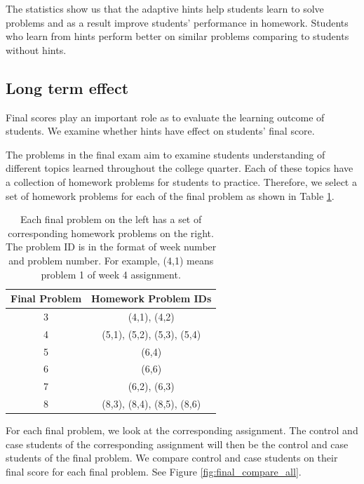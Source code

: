 \documentclass{llncs}
\begin{document}
The statistics show us that the adaptive hints help students learn to solve problems and as a result improve students' performance in homework. Students who learn from hints perform better on similar problems comparing to students without hints.

\subsection{Long term effect}
Final scores play an important role as to evaluate the learning outcome of students. We examine whether hints have effect on students' final score.

The problems in the final exam aim to examine students understanding of different topics learned throughout the college quarter. Each of these topics have a collection of homework problems for students to practice. Therefore, we select a set of homework problems for each of the final problem as shown in Table \ref{tab:map}.

\begin{table}[h]
\caption{Each final problem on the left has a set of corresponding homework problems on the right. The problem ID is in the format of week number and problem number. For example, (4,1) means problem 1 of week 4 assignment.}
\begin{center}
  \begin{tabular}{ c | c }
   Final Problem & Homework Problem IDs \\ \hline
	3 & (4,1), (4,2) \\
	4 & (5,1), (5,2), (5,3), (5,4) \\
    5 & (6,4) \\
    6 & (6,6) \\
    7 & (6,2), (6,3) \\
    8 & (8,3), (8,4), (8,5), (8,6) \\ \hline
  \end{tabular}
  \label{tab:map}
  \end{center}
\end{table}

For each final problem, we look at the corresponding assignment. The control and case students of the corresponding assignment will then be the control and case students of the final problem. We compare control and case students on their final score for each final problem. See Figure \ref{fig:final_compare_all}.
\end{document}
